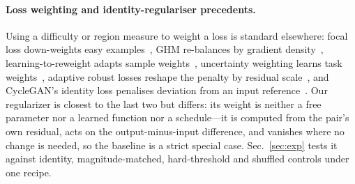 \paragraph{Loss weighting and identity-regulariser precedents.}
Using a difficulty or region measure to weight a loss is standard elsewhere: focal loss
down-weights easy examples~\cite{lin2017focal}, GHM re-balances by gradient
density~\cite{li2019ghm}, learning-to-reweight adapts sample weights~\cite{ren2018reweight},
uncertainty weighting learns task
weights~\cite{kendall2018uncertainty}, adaptive robust losses reshape the penalty by
residual scale~\cite{barron2019robust}, and CycleGAN's identity loss penalises deviation
from an input reference~\cite{zhu2017cyclegan}. Our regularizer is closest to the last
two but differs: its weight is neither a free parameter nor a learned function nor a
schedule---it is computed from the pair's own residual, acts on the
output-minus-input difference, and vanishes where no change is needed, so the baseline
is a strict special case. Sec.~\ref{sec:exp} tests it against identity,
magnitude-matched, hard-threshold and shuffled controls under one recipe.
